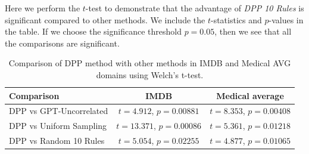 \documentclass{article}
\newcommand{\mytiny}{\fontsize{8pt}{10pt}\selectfont}
\begin{document}
\begin{table}[H]
    \centering
    \mytiny
   \caption{Mean and standard deviation over 3 independent trials for the Math \& Code fine-tuning setting.}
    \label{tab:Math_Code_STD}
\end{table}
Here we perform the $t$-test to demonstrate that the advantage of \textit{DPP 10 Rules} is significant compared to other methods. We include the $t$-statistics and $p$-values in the table. If we choose the significance threshold $p=0.05$, then we see that all the comparisons are significant.


\begin{table}[ht]
\centering
\footnotesize
\begin{tabular}{@{}lcc@{}}
\toprule
Comparison & IMDB & Medical average \\ \midrule
DPP vs GPT-Uncorrelated & \(t=4.912\), \(p=0.00881\) & \(t=8.353\), \(p=0.00408\) \\
DPP vs Uniform Sampling & \(t=13.371\), \(p=0.00086\) & \(t=5.361\), \(p=0.01218\) \\
DPP vs Random 10 Rules  & \(t=5.054\), \(p=0.02255\) & \(t=4.877\), \(p=0.01065\) \\
\bottomrule
\end{tabular}
\caption{Comparison of DPP method with other methods in IMDB and Medical AVG domains using Welch's t-test.}
\label{tab:method_comparison_imdb_medical}
\end{table}
\end{document}
